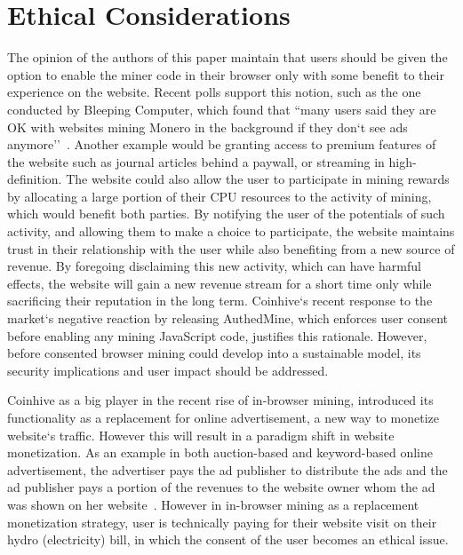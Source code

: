 

\section{Ethical Considerations}

The opinion of the authors of this paper maintain that users should be given the option to enable the miner code in their browser only with some benefit to their experience on the website. Recent polls support this notion, such as the one conducted by Bleeping Computer, which found that ``many users said they are OK with websites mining Monero in the background if they don`t see ads anymore''~\cite{bleepingcomputerminers}. Another example would be granting access to premium features of the website such as journal articles behind a paywall, or streaming in high-definition. The website could also allow the user to participate in mining rewards by allocating a large portion of their CPU resources to the activity of mining, which would benefit both parties. By notifying the user of the potentials of such activity, and allowing them to make a choice to participate, the website maintains trust in their relationship with the user while also benefiting from a new source of revenue. By foregoing disclaiming this new activity, which can have harmful effects, the website will gain a new revenue stream for a short time only while sacrificing their reputation in the long term. Coinhive`s recent response to the market`s negative reaction by releasing AuthedMine, which enforces user consent before enabling any mining JavaScript code, justifies this rationale. However, before consented browser mining could develop into a sustainable model, its security implications and user impact should be addressed.

Coinhive as a big player in the recent rise of in-browser mining, introduced its functionality as a replacement for online advertisement, a new way to monetize website`s traffic. However this will result in a paradigm shift in website monetization. As an example in both auction-based and keyword-based online advertisement, the advertiser pays the ad publisher to distribute the ads and the ad publisher pays a portion of the revenues to the website owner whom the ad was shown on her website~\cite{king2007internet}. However in in-browser mining as a replacement monetization strategy, user is technically paying for their website visit on their hydro (electricity) bill, in which the consent of the user becomes an ethical issue. 

